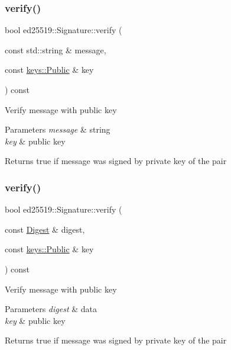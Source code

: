 \subsubsection{\texorpdfstring{verify()}{verify()}\hspace{0.1cm}{\footnotesize\ttfamily [2/3]}}
{\footnotesize\ttfamily bool ed25519\+::\+Signature\+::verify (\begin{DoxyParamCaption}\item[{const std\+::string \&}]{message,  }\item[{const \mbox{\hyperlink{classed25519_1_1keys_1_1_public}{keys\+::\+Public}} \&}]{key }\end{DoxyParamCaption}) const}

Verify message with public key 
\begin{DoxyParams}{Parameters}
{\em message} & string \\
\hline
{\em key} & public key \\
\hline
\end{DoxyParams}
\begin{DoxyReturn}{Returns}
true if message was signed by private key of the pair 
\end{DoxyReturn}
\mbox{\label{classed25519_1_1_signature_a906ffca7764e7879438a9c60d96ff207}} 
\subsubsection{\texorpdfstring{verify()}{verify()}\hspace{0.1cm}{\footnotesize\ttfamily [3/3]}}
{\footnotesize\ttfamily bool ed25519\+::\+Signature\+::verify (\begin{DoxyParamCaption}\item[{const \mbox{\hyperlink{structed25519_1_1_digest}{Digest}} \&}]{digest,  }\item[{const \mbox{\hyperlink{classed25519_1_1keys_1_1_public}{keys\+::\+Public}} \&}]{key }\end{DoxyParamCaption}) const}

Verify message with public key 
\begin{DoxyParams}{Parameters}
{\em digest} & data \\
\hline
{\em key} & public key \\
\hline
\end{DoxyParams}
\begin{DoxyReturn}{Returns}
true if message was signed by private key of the pair 
\end{DoxyReturn}


